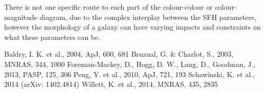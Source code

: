 \documentclass{mn2e}
\begin{document}
There is not one specific route to each part of the colour-colour or colour-magnitude diagram, due to the complex interplay between the SFH parameters, however the morphology of a galaxy can have varying impacts and constraints on what these parameters can be.

\begin{thebibliography}{}
 Baldry, I. K. et al., 2004, ApJ, 600, 681
 Bruzual, G. \& Charlot, S., 2003, MNRAS, 344, 1000
 Foreman-Mackey, D., Hogg, D. W., Lang, D., Goodman, J., 2013, PASP, 125, 306
 Peng, Y. et al., 2010, ApJ, 721, 193
 Schawinski, K. et al., 2014 (arXiv: 1402.4814)
 Willett, K. et al., 2014, MNRAS, 435, 2835
\end{thebibliography}
\end{document}
